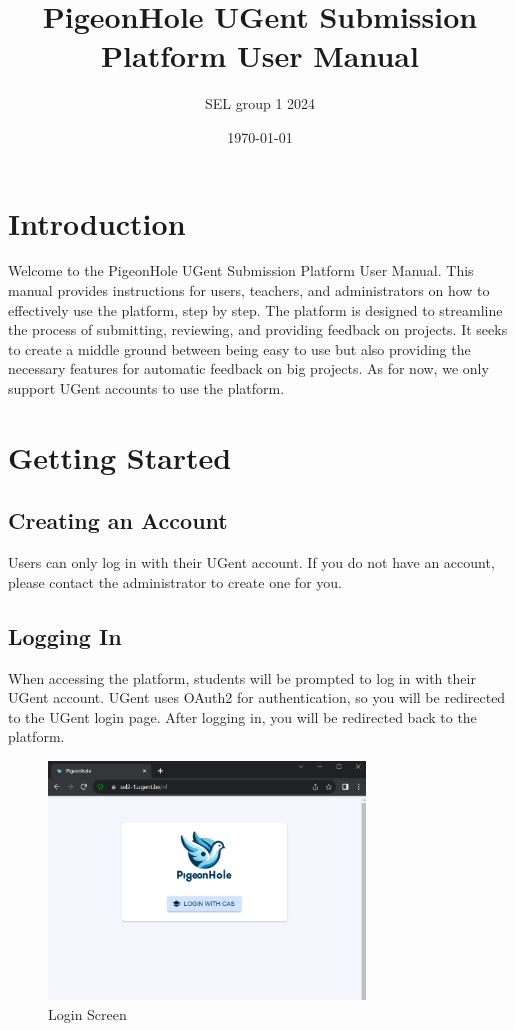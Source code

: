 \documentclass{article}
\title{PigeonHole UGent Submission Platform User Manual}
\author{SEL group 1 2024}
\date{\today}
\begin{document}
\maketitle

\tableofcontents

\section{Introduction}
Welcome to the PigeonHole UGent Submission Platform User Manual. This manual provides instructions for users, teachers, and administrators on how to effectively use the platform, step by step. The platform is designed to streamline the process of submitting, reviewing, and providing feedback on projects. It seeks to create a middle ground between being easy to use but also providing the necessary features for automatic feedback on big projects. As for now, we only support UGent accounts to use the platform.

\section{Getting Started}
\subsection{Creating an Account}
Users can only log in with their UGent account. If you do not have an account, please contact the administrator to create one for you.

\subsection{Logging In}
When accessing the platform, students will be prompted to log in with their UGent account. UGent uses OAuth2 for authentication, so you will be redirected to the UGent login page. After logging in, you will be redirected back to the platform.

\begin{figure}[H]
    \centering
    \includegraphics[width=0.75\textwidth]{images/login.png}
    \caption{Login Screen}
    \label{fig:login}
\end{figure}
\end{document}
